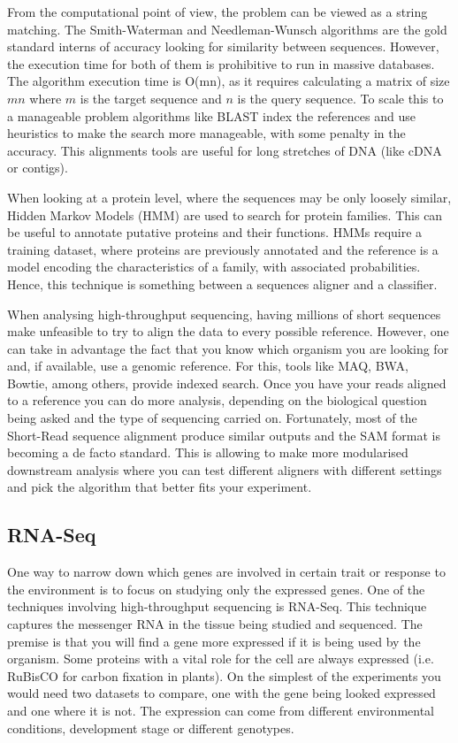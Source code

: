 From the computational point of view, the problem can be viewed as a string matching. The Smith-Waterman\cite{Smith1981} and Needleman-Wunsch\cite{Needleman1970} algorithms are the gold standard interns of accuracy looking for similarity between sequences. However, the execution time for both of them is prohibitive to run in massive databases. The algorithm execution time is O(mn), as it requires calculating a matrix of size $mn$ where $m$ is the target sequence and $n$ is the query sequence.  To scale this to a manageable problem algorithms like BLAST index the references and use heuristics to make the search more manageable, with some penalty in the accuracy. This alignments tools are useful for long stretches of DNA (like cDNA or contigs)\cite{Altschul1990}.

When looking at a protein level, where the sequences may be only loosely similar, Hidden Markov Models (HMM) are used to search for protein families. This can be useful to annotate putative proteins and their functions. HMMs require a training dataset, where proteins are previously annotated and the reference is a model encoding the characteristics of a family, with associated probabilities. Hence, this technique is something between a sequences aligner and a classifier\cite{Eddy2004}. 

When analysing high-throughput sequencing, having millions of short sequences make unfeasible to try to align the data to every possible reference. However, one can take in advantage the fact that you know which organism you are looking for and, if available, use a genomic reference. For this, tools like MAQ, BWA, Bowtie, among others, provide indexed search.  Once you have your reads aligned to a reference you can do more analysis, depending on the biological question being asked and the type of sequencing carried on.  Fortunately, most of the Short-Read sequence alignment produce similar outputs and the SAM format is becoming a de facto standard. This is allowing to make more modularised downstream analysis where you can test different aligners with different settings and pick the algorithm that better fits your experiment\cite{Liu2012,Li2009,Li2009a}. 

\subsection{RNA-Seq}

One way to narrow down which genes are involved in certain trait or response to the environment is to focus on studying only the expressed genes. One of the techniques involving high-throughput sequencing is RNA-Seq. This technique captures the messenger RNA in the tissue being studied and sequenced. The premise is that you will find a gene more expressed if it is being used by the organism. Some proteins with a vital role for the cell are always expressed (i.e. RuBisCO for carbon fixation in plants\cite{CooperGM2000}). On the simplest of the experiments you would need two datasets to compare, one with the gene being looked expressed and one where it is not. The expression can come from different environmental conditions, development stage or different genotypes.\cite{Mortazavi2008} 

